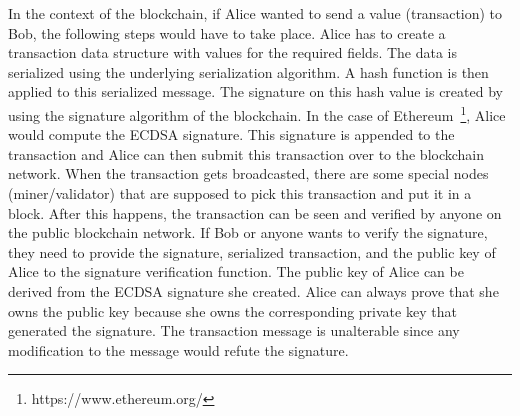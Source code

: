 In the context of the blockchain, if Alice wanted to send a value (transaction)
to Bob, the following steps would have to take place. Alice has to create a
transaction data structure with values for the required fields.  The data is
serialized using the underlying serialization algorithm. A hash function is
then applied to this serialized message. The signature on this hash value is
created by using the signature algorithm of the blockchain. In the case of
Ethereum~\footnote{https://www.ethereum.org/}, Alice would compute the ECDSA
signature. This signature is appended to the transaction and Alice can then
submit this transaction over to the blockchain network. When the transaction
gets broadcasted, there are some special nodes (miner/validator) that are
supposed to pick this transaction and put it in a block. After this happens,
the transaction can be seen and verified by anyone on the public blockchain
network. If Bob or anyone wants to verify the signature, they need to provide
the signature, serialized transaction, and the public key of Alice to the
signature verification function. The public key of Alice can be derived from
the ECDSA signature she created. Alice can always prove that she owns the
public key because she owns the corresponding private key that generated the
signature. The transaction message is unalterable since any modification to the
message would refute the signature.  
